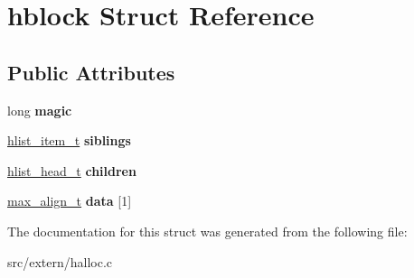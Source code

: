 \hypertarget{structhblock}{\section{hblock Struct Reference}
\label{structhblock}
}
\subsection*{Public Attributes}
\begin{DoxyCompactItemize}
\item 
\hypertarget{structhblock_a153b5da8ecf893b2c42437d48dba17cb}{long {\bfseries magic}}\label{structhblock_a153b5da8ecf893b2c42437d48dba17cb}

\item 
\hypertarget{structhblock_af8794248885632f39ebdc77d65131e36}{\hyperlink{structhlist__item}{hlist\-\_\-item\-\_\-t} {\bfseries siblings}}\label{structhblock_af8794248885632f39ebdc77d65131e36}

\item 
\hypertarget{structhblock_a06a5e75af57f90d5e61a41c2e1b2f46d}{\hyperlink{structhlist__head}{hlist\-\_\-head\-\_\-t} {\bfseries children}}\label{structhblock_a06a5e75af57f90d5e61a41c2e1b2f46d}

\item 
\hypertarget{structhblock_aaf975b14c3fd89f7e9c4df27b27eb816}{\hyperlink{unionmax__align}{max\-\_\-align\-\_\-t} {\bfseries data} \mbox{[}1\mbox{]}}\label{structhblock_aaf975b14c3fd89f7e9c4df27b27eb816}

\end{DoxyCompactItemize}


The documentation for this struct was generated from the following file\-:\begin{DoxyCompactItemize}
\item 
src/extern/halloc.\-c\end{DoxyCompactItemize}
